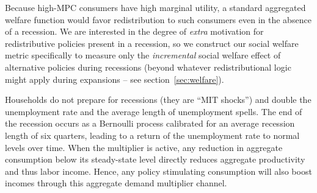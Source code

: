 \documentclass[\econtexRoot/HAFiscal]{subfiles}
\begin{document}
Because high-MPC consumers have high marginal utility, a standard aggregated welfare function would favor redistribution to such consumers even in the absence of a recession. We are interested in the degree of \textit{extra} motivation for redistributive policies present in a recession, so we construct our social welfare metric specifically to measure only the \textit{incremental} social welfare effect of alternative policies during recessions (beyond whatever redistributional logic might apply during expansions -- see section~\ref{sec:welfare}).


Households do not prepare for recessions (they are ``MIT shocks'') and double the unemployment rate and the average length of unemployment spells. The end of the recession occurs as a Bernoulli process calibrated for an average recession length of six quarters, leading to a return of the unemployment rate to normal levels over time. When the multiplier is active, any reduction in aggregate consumption below its steady-state level directly reduces aggregate productivity and thus labor income. Hence, any policy stimulating consumption will also boost incomes through this aggregate demand multiplier channel.

\end{document}
